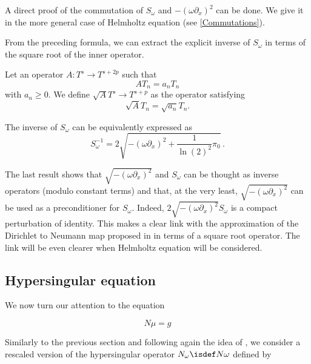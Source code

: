 \documentclass[a4paper]{article}
\begin{document}
	\begin{Rem} A direct proof of the commutation of $S_\omega$ and $-(\omega\partial_x)^2$ can be done. We give it in the 
		more general case of Helmholtz equation (see \autoref{Commutations}).
	\end{Rem}	
	From the preceding formula, we can extract the explicit inverse of $S_\omega$ in terms of the square root of the inner operator.
	\begin{Def}
		Let an operator $A : T^s \to T^{s + 2p}$ such that 
		\[AT_n = a_n T_n\]
		with $a_n \geq 0$. We define $\sqrt{A} T^s \to T^{s + p}$ as the operator satisfying 
		\[\sqrt{A}T_n = \sqrt{a_n} T_n.\]
	\end{Def}
	
	\begin{Cor}
		The inverse of $S_\omega$ can be equivalently expressed as 
		\begin{equation}
		S_{\omega}^{-1} = 2\sqrt{-(\omega \partial_x)^2 + \frac{1}{\ln(2)^2}\pi_0}\,.
		\end{equation}
	\end{Cor}
	
	The last result shows that $\sqrt{-(\omega \partial_x)^2}$ and $S_\omega$ can be thought as inverse operators (modulo constant terms) and that, at the very least, $\sqrt{-(\omega \partial_x)^2}$ can be used as a preconditioner for $S_\omega$. Indeed, $2\sqrt{-(\omega \partial_x)^2}S_\omega$ is a compact perturbation of identity. This makes a clear link with the approximation of the Dirichlet to Neumann map proposed in \cite{antoine2007generalized} in terms of a square root operator. The link will be even clearer when Helmholtz equation will be considered. 
	
	\subsection{Hypersingular equation} 
	
	We now turn our attention to the equation 
	
	\begin{equation}
	N\mu = g
	\label{Nmu}
	\end{equation} 
	
	Similarly to the previous section and following again the idea of \cite{bruno2012second}, we consider a rescaled version of the hypersingular operator $N_\omega \isdef N \omega$ defined by
	
\end{document}
